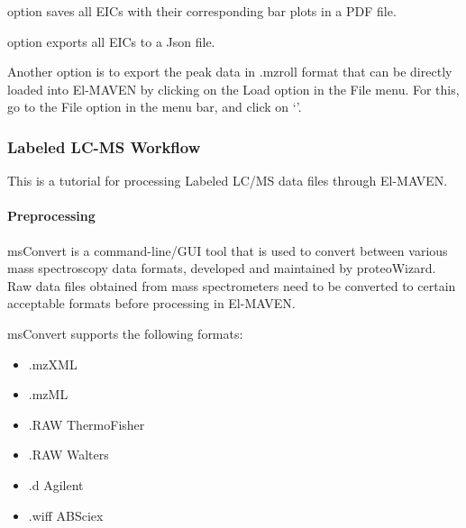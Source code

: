 \documentclass[letterpaper,10pt,english,openany,oneside]{sphinxmanual}
\begin{document}
 option  saves all EICs with their corresponding bar plots in a PDF file.

 option  exports all EICs to a Json file.

Another option is to export the peak data in .mzroll format that can be directly loaded into El-MAVEN by clicking on the Load  option in the File menu. For this, go to the File option in the menu bar, and click on ‘’.



\subsubsection{Labeled LC-MS Workflow}
\label{\detokenize{LabeledLCMSWorkflow:labeled-lc-ms-workflow}}\label{\detokenize{LabeledLCMSWorkflow::doc}}
This is a tutorial for processing Labeled LC/MS data files through El-MAVEN.


\paragraph{Preprocessing}
\label{\detokenize{LabeledLCMSWorkflow:preprocessing}}
msConvert is a command-line/GUI tool that is used to convert between various mass spectroscopy data formats, developed and maintained by proteoWizard. Raw data files obtained from mass spectrometers need to be converted to certain acceptable formats before processing in El-MAVEN.


msConvert supports the following formats:
\begin{itemize}
\item {} 
.mzXML

\item {} 
.mzML

\item {} 
.RAW ThermoFisher

\item {} 
.RAW Walters

\item {} 
.d Agilent

\item {} 
.wiff ABSciex

\end{itemize}
\end{document}
